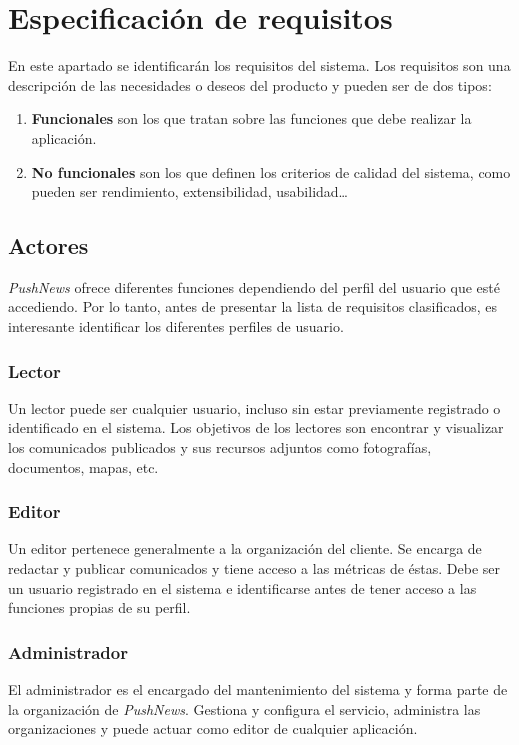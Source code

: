 \chapter{Especificación de requisitos}
En este apartado se identificarán los requisitos del sistema. Los requisitos son una descripción de las necesidades o deseos del producto \cite{Larman2004} y pueden ser de dos tipos:
\begin{enumerate}
    \item \textbf{Funcionales} son los que tratan sobre las funciones que debe realizar la aplicación.
    \item \textbf{No funcionales} son los que definen los criterios de calidad del sistema, como pueden ser rendimiento, extensibilidad, usabilidad\dots
\end{enumerate}

\section {Actores}
\emph{PushNews} ofrece diferentes funciones dependiendo del perfil del usuario que esté accediendo. Por lo tanto, antes de presentar la lista de requisitos clasificados, es interesante identificar los diferentes perfiles de usuario.

\subsection{Lector}
Un lector puede ser cualquier usuario, incluso sin estar previamente registrado o identificado en el sistema. Los objetivos de los lectores son encontrar y visualizar los comunicados publicados y sus recursos adjuntos como fotografías, documentos, mapas, etc.

\subsection{Editor}
Un editor pertenece generalmente a la organización del cliente. Se encarga de redactar y publicar comunicados y tiene acceso a las métricas de éstas. Debe ser un usuario registrado en el sistema e identificarse antes de tener acceso a las funciones propias de su perfil.

\subsection{Administrador}
El administrador es el encargado del mantenimiento del sistema y forma parte de la organización de \emph{PushNews}. Gestiona y configura el servicio, administra las organizaciones y puede actuar como editor de cualquier aplicación.

